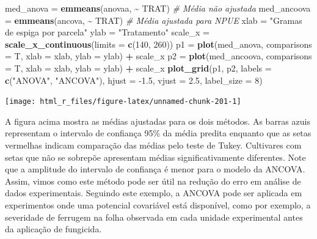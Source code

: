\documentclass[
]{book}
\newenvironment{Shaded}{\begin{snugshade}}{\end{snugshade}}
\newcommand{\CommentTok}[1]{\textcolor[rgb]{0.56,0.35,0.01}{\textit{#1}}}
\newcommand{\DataTypeTok}[1]{\textcolor[rgb]{0.13,0.29,0.53}{#1}}
\newcommand{\DecValTok}[1]{\textcolor[rgb]{0.00,0.00,0.81}{#1}}
\newcommand{\FloatTok}[1]{\textcolor[rgb]{0.00,0.00,0.81}{#1}}
\newcommand{\KeywordTok}[1]{\textcolor[rgb]{0.13,0.29,0.53}{\textbf{#1}}}
\newcommand{\NormalTok}[1]{#1}
\newcommand{\OperatorTok}[1]{\textcolor[rgb]{0.81,0.36,0.00}{\textbf{#1}}}
\newcommand{\StringTok}[1]{\textcolor[rgb]{0.31,0.60,0.02}{#1}}
\numberwithin{equation}{section}
\newcommand{\indt}[1]{\index{#1|ST}}
\begin{document}
\begin{Shaded}
\begin{Highlighting}[]
\NormalTok{med\_anova =}\StringTok{ }\KeywordTok{emmeans}\NormalTok{(anovaa, }\OperatorTok{\textasciitilde{}}\StringTok{ }\NormalTok{TRAT) }\CommentTok{\# Média não ajustada}
\NormalTok{med\_ancoova =}\StringTok{ }\KeywordTok{emmeans}\NormalTok{(ancova, }\OperatorTok{\textasciitilde{}}\StringTok{ }\NormalTok{TRAT) }\CommentTok{\# Média ajustada para NPUE}
\NormalTok{xlab =}\StringTok{ "Gramas de espiga por parcela"}
\NormalTok{ylab =}\StringTok{ "Tratamento"}
\NormalTok{scale\_x =}\StringTok{ }\KeywordTok{scale\_x\_continuous}\NormalTok{(}\DataTypeTok{limits =} \KeywordTok{c}\NormalTok{(}\DecValTok{140}\NormalTok{, }\DecValTok{260}\NormalTok{))}
\NormalTok{p1 =}\StringTok{ }\KeywordTok{plot}\NormalTok{(med\_anova, }\DataTypeTok{comparisons =}\NormalTok{ T, }\DataTypeTok{xlab =}\NormalTok{ xlab, }\DataTypeTok{ylab =}\NormalTok{ ylab) }\OperatorTok{+}\StringTok{ }\NormalTok{scale\_x}
\NormalTok{p2 =}\StringTok{ }\KeywordTok{plot}\NormalTok{(med\_ancoova, }\DataTypeTok{comparisons =}\NormalTok{ T, }\DataTypeTok{xlab =}\NormalTok{ xlab, }\DataTypeTok{ylab =}\NormalTok{ ylab) }\OperatorTok{+}\StringTok{ }\NormalTok{scale\_x}
\KeywordTok{plot\_grid}\NormalTok{(p1, p2, }\DataTypeTok{labels =} \KeywordTok{c}\NormalTok{(}\StringTok{"ANOVA"}\NormalTok{, }\StringTok{"ANCOVA"}\NormalTok{),}
          \DataTypeTok{hjust =} \FloatTok{{-}1.5}\NormalTok{, }\DataTypeTok{vjust =} \FloatTok{2.5}\NormalTok{, }\DataTypeTok{label\_size =} \DecValTok{8}\NormalTok{)}
\end{Highlighting}
\end{Shaded}

\begin{center}\texttt{[image: html\_r\_files/figure-latex/unnamed-chunk-201-1]} \end{center}

A figura acima mostra as médias ajustadas para os dois métodos. As barras azuis representam o intervalo de confiança 95\% da média predita enquanto que as setas vermelhas indicam comparação das médias pelo teste de Tukey. Cultivares com setas que não se sobrepõe apresentam médias significativamente diferentes. Note que a amplitude do intervalo de confiança é menor para o modelo da ANCOVA. Assim, vimos como este método pode ser útil na redução do erro em análise de dados experimentais. Seguindo este exemplo, a ANCOVA\indt{ANCOVA} pode ser aplicada em experimentos onde uma potencial covariável está disponível, como por exemplo, a severidade de ferrugem na folha observada em cada unidade experimental antes da aplicação de fungicida.
\end{document}
